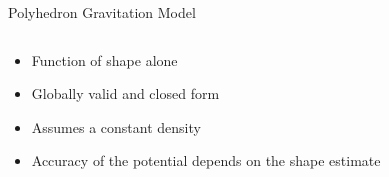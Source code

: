 \begin{frame}{Polyhedron Gravitation Model}

\begin{columns}
\begin{column}{0.5\textwidth}
\begin{itemize}
    \item Function of shape alone
    \item Globally valid and closed form
    \item Assumes a constant density
    \item Accuracy of the potential depends on the shape estimate
\end{itemize}
\end{column}
\begin{column}{0.5\textwidth}
    \resizebox{\columnwidth}{!}{%
    
}
\end{column}
\end{columns}
\end{frame}
